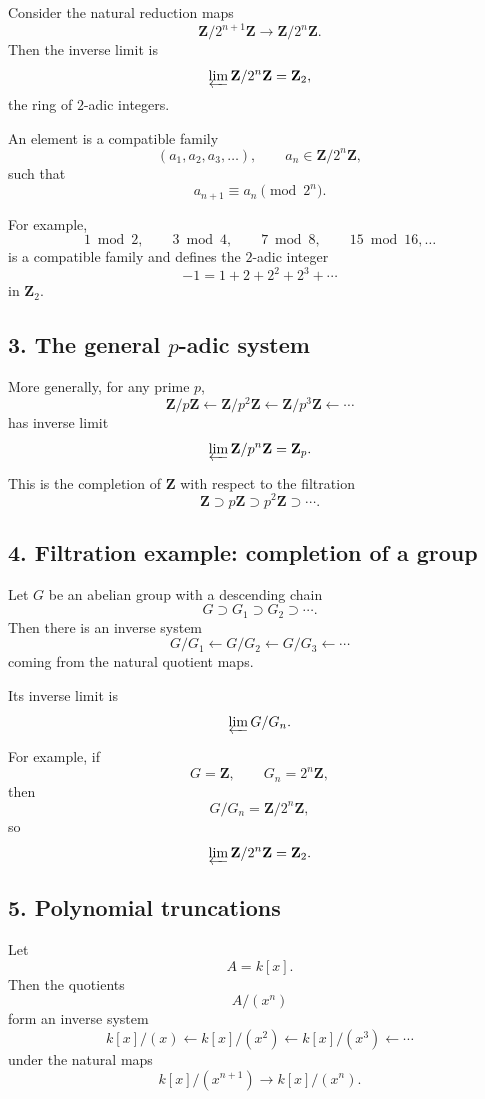 \documentclass[12pt,a4paper]{article}
\theoremstyle{plain}
\theoremstyle{definition}      %
\begin{document}
	Consider the natural reduction maps
	\[
	\mathbf Z/2^{n+1}\mathbf Z \to \mathbf Z/2^n\mathbf Z.
	\]
	Then the inverse limit is
	\[
	\varprojlim \mathbf Z/2^n\mathbf Z = \mathbf Z_2,
	\]
	the ring of \(2\)-adic integers.
	
	An element is a compatible family
	\[
	(a_1,a_2,a_3,\dots),\qquad a_n\in \mathbf Z/2^n\mathbf Z,
	\]
	such that
	\[
	a_{n+1}\equiv a_n \pmod{2^n}.
	\]
	
	For example,
	\[
	1 \bmod 2,\qquad
	3 \bmod 4,\qquad
	7 \bmod 8,\qquad
	15 \bmod 16,\dots
	\]
	is a compatible family and defines the \(2\)-adic integer
	\[
	-1 = 1+2+2^2+2^3+\cdots
	\]
	in \(\mathbf Z_2\).
	
	\subsection*{3. The general \(p\)-adic system}
	
	More generally, for any prime \(p\),
	\[
	\mathbf Z/p\mathbf Z
	\xleftarrow{}
	\mathbf Z/p^2\mathbf Z
	\xleftarrow{}
	\mathbf Z/p^3\mathbf Z
	\xleftarrow{}\cdots
	\]
	has inverse limit
	\[
	\varprojlim \mathbf Z/p^n\mathbf Z = \mathbf Z_p.
	\]
	
	This is the completion of \(\mathbf Z\) with respect to the filtration
	\[
	\mathbf Z \supset p\mathbf Z \supset p^2\mathbf Z \supset \cdots.
	\]
	
	\subsection*{4. Filtration example: completion of a group}
	
	Let \(G\) be an abelian group with a descending chain
	\[
	G \supset G_1 \supset G_2 \supset \cdots.
	\]
	Then there is an inverse system
	\[
	G/G_1 \xleftarrow{} G/G_2 \xleftarrow{} G/G_3 \xleftarrow{}\cdots
	\]
	coming from the natural quotient maps.
	
	Its inverse limit is
	\[
	\varprojlim G/G_n.
	\]
	
	For example, if
	\[
	G=\mathbf Z,\qquad G_n=2^n\mathbf Z,
	\]
	then
	\[
	G/G_n=\mathbf Z/2^n\mathbf Z,
	\]
	so
	\[
	\varprojlim \mathbf Z/2^n\mathbf Z = \mathbf Z_2.
	\]
	
	\subsection*{5. Polynomial truncations}
	
	Let
	\[
	A=k[x].
	\]
	Then the quotients
	\[
	A/(x^n)
	\]
	form an inverse system
	\[
	k[x]/(x) \xleftarrow{} k[x]/(x^2) \xleftarrow{} k[x]/(x^3) \xleftarrow{}\cdots
	\]
	under the natural maps
	\[
	k[x]/(x^{n+1}) \to k[x]/(x^n).
	\]
	
\end{document}
